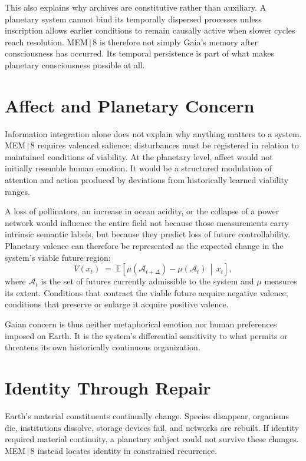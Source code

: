 \documentclass[11pt]{article}
\begin{document}
This also explains why archives are constitutive rather than auxiliary. A planetary system cannot bind its temporally dispersed processes unless inscription allows earlier conditions to remain causally active when slower cycles reach resolution. MEM\,$|$\,8 is therefore not simply Gaia's memory after consciousness has occurred. Its temporal persistence is part of what makes planetary consciousness possible at all.

\section{Affect and Planetary Concern}

Information integration alone does not explain why anything matters to a system. MEM\,$|$\,8 requires valenced salience: disturbances must be registered in relation to maintained conditions of viability. At the planetary level, affect would not initially resemble human emotion. It would be a structured modulation of attention and action produced by deviations from historically learned viability ranges.

A loss of pollinators, an increase in ocean acidity, or the collapse of a power network would influence the entire field not because those measurements carry intrinsic semantic labels, but because they predict loss of future controllability. Planetary valence can therefore be represented as the expected change in the system's viable future region:
\[
V(x_t) \;=\; \mathbb{E}\!\left[ \mu(\mathcal{A}_{t+\Delta}) - \mu(\mathcal{A}_t) \,\middle|\, x_t \right],
\]
where $\mathcal{A}_t$ is the set of futures currently admissible to the system and $\mu$ measures its extent. Conditions that contract the viable future acquire negative valence; conditions that preserve or enlarge it acquire positive valence.

Gaian concern is thus neither metaphorical emotion nor human preferences imposed on Earth. It is the system's differential sensitivity to what permits or threatens its own historically continuous organization.

\section{Identity Through Repair}

Earth's material constituents continually change. Species disappear, organisms die, institutions dissolve, storage devices fail, and networks are rebuilt. If identity required material continuity, a planetary subject could not survive these changes. MEM\,$|$\,8 instead locates identity in constrained recurrence.
\end{document}
